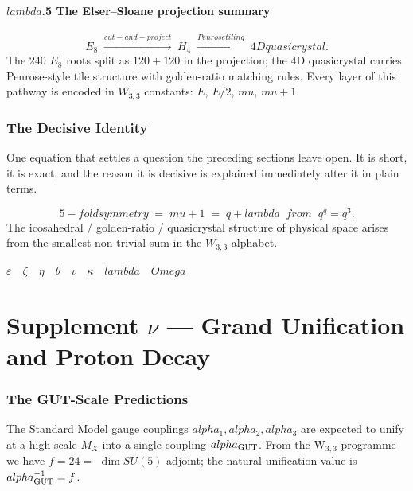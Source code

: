 \documentclass[12pt,a4paper]{article}
\def\mathrm#1{#1}%
\def\text#1{#1}%
\def\alpha{alpha}%
\def\lambda{lambda}%
\def\mu{mu}%
\def\Omega{Omega}%
\theoremstyle{definition}
\newcommand{\SU}{\mathrm{SU}}
\begin{document}
\subsection*{$\lambda$.5 \quad The Elser--Sloane projection summary}
\[
E_8 \;\xrightarrow{\text{cut-and-project}}\; H_4 \;\xrightarrow{\text{Penrose tiling}}\; \text{4D quasicrystal}.
\]
The 240 $E_8$ roots split as $120 + 120$ in the projection; the 4D
quasicrystal carries Penrose-style tile structure with golden-ratio
matching rules. Every layer of this pathway is encoded in $W_{3,3}$
constants: $E$, $E/2$, $\mu$, $\mu+1$.

\section*{The Decisive Identity}

\begin{plainbox}
One equation that settles a question the preceding sections leave open. It is short,
it is exact, and the reason it is decisive is explained immediately after it in plain
terms.
\end{plainbox}


\[
\boxed{\;\text{5-fold symmetry} \;=\; \mu + 1 \;=\; q + \lambda \;\;\text{from}\;\; q^q = q^3.\;}
\]
The icosahedral / golden-ratio / quasicrystal structure of physical
space arises from the smallest non-trivial sum in the $W_{3,3}$
alphabet.

\hfill$\varepsilon\quad\zeta\quad\eta\quad\theta\quad\iota\quad\kappa\quad\lambda\quad\Omega$

\clearpage
\part*{\texorpdfstring{Supplement $\nu$ --- Grand Unification and Proton Decay}{Supplement nu --- Grand Unification and Proton Decay}}

\section*{The GUT-Scale Predictions}

The Standard Model gauge couplings $\alpha_1, \alpha_2, \alpha_3$ are
expected to unify at a high scale $M_X$ into a single coupling
$\alpha_{\rm GUT}$. From the W$_{3,3}$ programme we have $f=24 =$
$\dim\SU(5)$ adjoint; the natural unification value is
$\alpha_{\rm GUT}^{-1} = f$.
\end{document}
